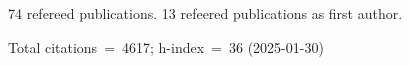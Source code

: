 74 refereed publications. 13 refeered publications as first author.

Total citations~=~4617; h-index~=~36 (2025-01-30)